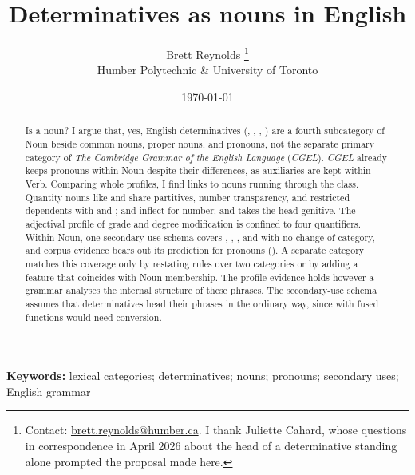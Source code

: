 \documentclass[12pt]{article}
\title{Determinatives as nouns in English}
\author{Brett Reynolds \orcidlink{0000-0003-0073-7195}%
\thanks{Contact: \href{mailto:brett.reynolds@humber.ca}{brett.reynolds@humber.ca}. I thank Juliette Cahard, whose questions in correspondence in April 2026 about the head of a determinative standing alone prompted the proposal made here.}\\
Humber Polytechnic \& University of Toronto}
\date{\today}
\begin{document}
\maketitle

\begin{abstract}
Is  a noun? I argue that, yes, English determinatives (, , , ) are a fourth subcategory of Noun beside common nouns, proper nouns, and pronouns, not the separate primary category of \textit{The Cambridge Grammar of the English Language} (\textit{CGEL}). \textit{CGEL} already keeps pronouns within Noun despite their differences, as auxiliaries are kept within Verb. Comparing whole profiles, I find links to nouns running through the class. Quantity nouns like  and  share partitives, number transparency, and restricted dependents with  and ;  and  inflect for number; and  takes the head genitive. The adjectival profile of grade and degree modification is confined to four quantifiers. Within Noun, one secondary-use schema covers , , , and  with no change of category, and corpus evidence bears out its prediction for pronouns (). A separate category matches this coverage only by restating rules over two categories or by adding a feature that coincides with Noun membership. The profile evidence holds however a grammar analyses the internal structure of these phrases. The secondary-use schema assumes that determinatives head their phrases in the ordinary way, since with fused functions  would need conversion.
\end{abstract}

\noindent\textbf{Keywords:} lexical categories; determinatives; nouns; pronouns; secondary uses; English grammar

\end{document}

